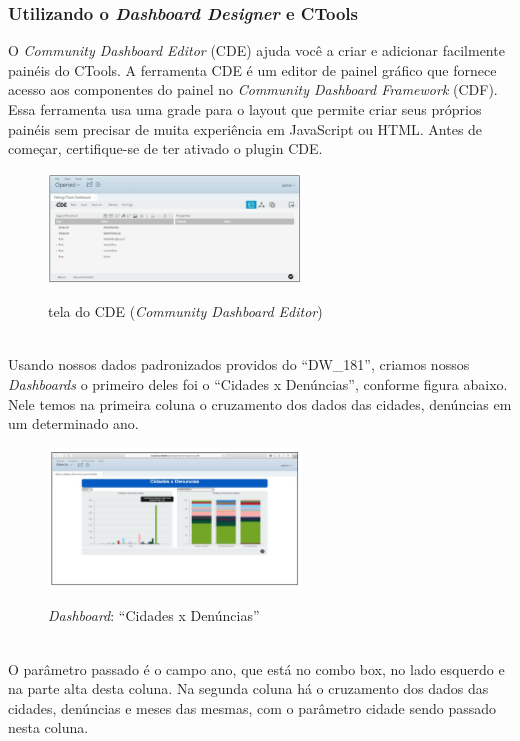 \subsubsection{Utilizando o \textit{Dashboard Designer} e CTools}

O \textit{Community Dashboard Editor} (CDE) ajuda você a criar e adicionar facilmente pain\'{e}is do CTools. A ferramenta CDE \'{e} um editor de painel gr\'{a}fico que fornece acesso aos componentes do painel no \textit{Community Dashboard Framework} (CDF). Essa ferramenta usa uma grade para o layout que permite criar seus pr\'oprios pain\'{e}is sem precisar de muita experiência em JavaScript ou HTML. Antes de come\c{c}ar, certifique-se de ter ativado o plugin CDE.

\begin{figure}[H]
	\vspace*{0,2cm}
    \centering
    \caption{tela do CDE (\textit{Community Dashboard Editor})}
    \includegraphics[width=0.6\textwidth]{./04-figuras/figura-cde}
    \label{fig:ilustfigcde}
\end{figure}
\vspace*{-0,9cm}
{\raggedright {}} \\

Usando nossos dados padronizados providos do ``DW\_181'', criamos nossos \textit{Dashboards} o primeiro deles foi o ``Cidades x Denúncias'', conforme figura abaixo. Nele temos na primeira coluna o cruzamento dos dados das cidades, denúncias em um determinado ano.

\begin{figure}[H]
	\vspace*{0,2cm}
    \centering
    \caption{\textit{Dashboard}: ``Cidades x Denúncias''}
    \includegraphics[width=0.6\textwidth]{./04-figuras/figura-dashboard-cxd}
    \label{fig:ilustfigdcxd}
\end{figure}
\vspace*{-0,9cm}
{\raggedright {}} \\

O parâmetro passado \'{e} o campo ano, que est\'{a} no combo box, no lado esquerdo e na parte alta desta coluna. Na segunda coluna h\'{a} o cruzamento dos dados das cidades, denúncias e meses das mesmas, com o parâmetro cidade sendo passado nesta coluna.
